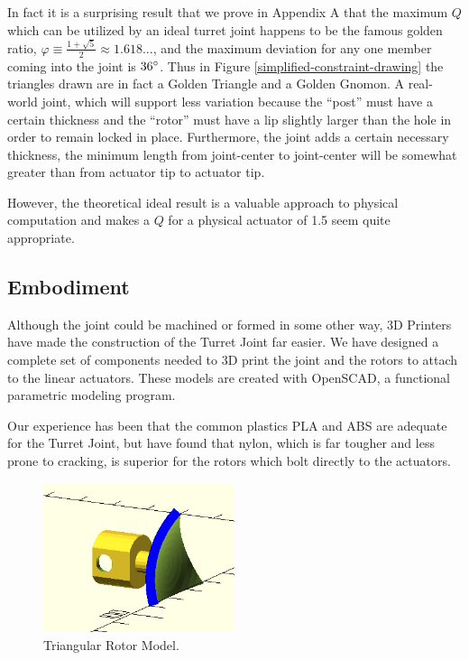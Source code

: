 \documentclass[11pt]{article}
\begin{document}
In fact it is a surprising result that we prove in Appendix A that the maximum $Q$ which can be utilized
by an ideal turret joint happens to be
the famous golden ratio, $\varphi \equiv \frac{1 + \sqrt{5}}{2} \approx 1.618...$, and the maximum deviation for any one member coming
into the joint is $36\degree$.
Thus in Figure \ref{simplified-constraint-drawing} the triangles drawn are in fact a Golden Triangle and a Golden Gnomon.
A real-world joint, which will support less variation because the ``post'' must have a
certain thickness and the ``rotor'' must have a lip
slightly larger than the hole in order to remain locked in place.
Furthermore, the joint adds a certain necessary thickness, the minimum length
 from joint-center to joint-center will be somewhat greater than from actuator tip to actuator tip.

 However, the theoretical ideal result is a valuable approach to physical computation and makes a $Q$ for a physical actuator of 1.5 seem quite appropriate.

 \subsection{Embodiment}

 Although the joint could be machined or formed in some other way,
 3D Printers have made the construction of the Turret Joint far easier.
 We have designed a complete set of components needed to 3D print the joint and the rotors to attach to
 the linear actuators. These models are created with OpenSCAD, a functional parametric modeling program.

 Our experience has been that the common plastics PLA and ABS are adequate for the Turret Joint,
 but have found that nylon, which is far tougher and less prone to cracking, is superior for the
 rotors which bolt directly to the actuators.

 \begin{figure}[H]
  \centering
    \includegraphics[width=0.5\textwidth]{figures/RotorModel.png}
    \caption[Triangular Rotor Model]{Triangular Rotor Model.}
      \label{rotormodel}
\end{figure}
\end{document}
